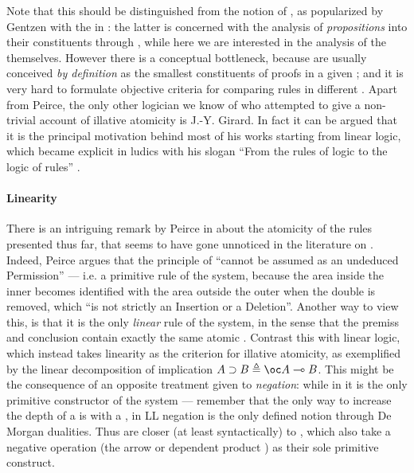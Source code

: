 \begin{scope}
Note that this should be distinguished from the notion of \emph{}, as
popularized by Gentzen with the \emph{} in : the latter is concerned with the analysis of \emph{propositions} into
their constituents through , while here we are interested in
the analysis of the  themselves. However there is a conceptual bottleneck, because
 are usually conceived \emph{by definition} as the smallest
constituents of proofs in a given ; and it is very hard to
formulate objective criteria for comparing rules in different . Apart from Peirce, the only other logician we know of who attempted to
give a non-trivial account of illative atomicity is J.-Y. Girard. In fact it can
be argued that it is the principal motivation behind most of his works starting
from linear logic, which became explicit in ludics with his slogan ``From the
rules of logic to the logic of rules'' \cite{girard_locus_2001}.

\paragraph{Linearity}

There is an intriguing remark by Peirce in
\cite[pp.~536--537]{peirce_prolegomena_1906} about the atomicity of the rules
presented thus far, that seems to have gone unnoticed in the literature on .
Indeed, Peirce argues that the principle of  ``cannot be
assumed as an undeduced Permission'' --- i.e. a primitive rule of the system,
because the area inside the inner  becomes identified with the area outside
the outer  when the double  is removed, which ``is not strictly an
Insertion or a Deletion''. Another way to view this, is that it is the only
\emph{linear} rule of the system, in the sense that the premiss and conclusion
contain exactly the same atomic . Contrast this with linear logic, which
instead takes linearity as the criterion for illative atomicity, as exemplified
by the linear decomposition of implication $A \limp B \defeq \oc A \multimap B$.
This might be the consequence of an opposite treatment given to \emph{negation}:
while in  it is the only primitive constructor of the system --- remember that
the only way to increase the depth of a  is with a , in LL negation is
the only defined notion through De Morgan dualities. Thus  are closer (at
least syntactically) to \emph{}, which also take a negative
operation (the arrow or dependent product ) as their sole primitive
construct.


\end{scope}
